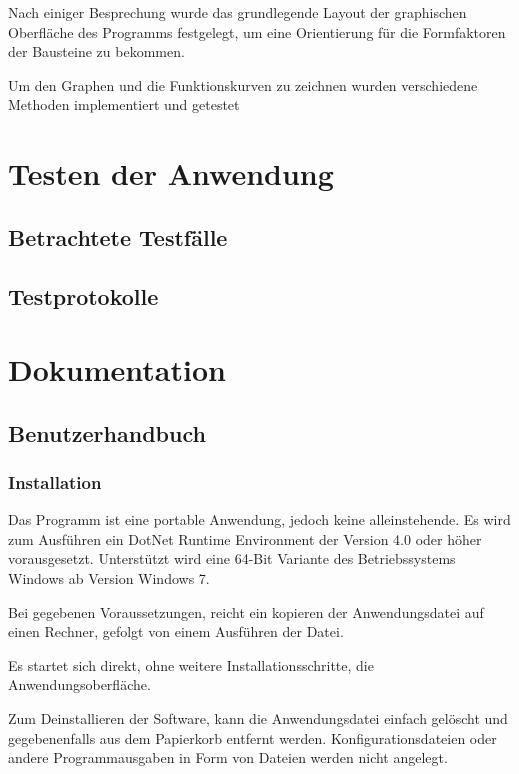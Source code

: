 \documentclass{article}
\begin{document}
    Nach einiger Besprechung wurde das grundlegende Layout der graphischen Oberfläche des Programms festgelegt, um eine Orientierung für die Formfaktoren der Bausteine zu bekommen.

    Um den Graphen und die Funktionskurven zu zeichnen wurden verschiedene Methoden implementiert und getestet

\newpage
\section{Testen der Anwendung}

\subsection{Betrachtete Testfälle}


\subsection{Testprotokolle}


\newpage
\section{Dokumentation}

\subsection{Benutzerhandbuch}
    \subsubsection{Installation}

    Das Programm ist eine portable Anwendung, jedoch keine alleinstehende.
    Es wird zum Ausführen ein DotNet Runtime Environment der Version 4.0 oder höher vorausgesetzt.
    Unterstützt wird eine 64-Bit Variante des Betriebssystems Windows ab Version \glqq Windows 7\grqq{}.
    
    Bei gegebenen Voraussetzungen, reicht ein kopieren der Anwendungsdatei auf einen Rechner, gefolgt von einem Ausführen der Datei.
    
    Es startet sich direkt, ohne weitere Installationsschritte, die Anwendungsoberfläche.
    
    Zum Deinstallieren der Software, kann die Anwendungsdatei einfach gelöscht und gegebenenfalls aus dem Papierkorb entfernt werden.
    Konfigurationsdateien oder andere Programmausgaben in Form von Dateien werden nicht angelegt.
\end{document}
